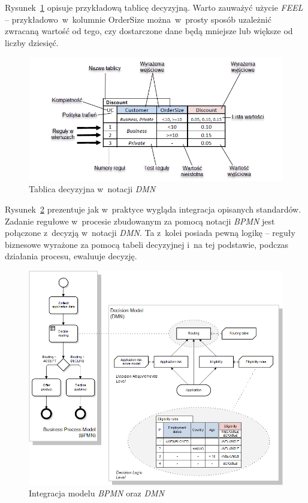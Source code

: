 Rysunek~\ref{fig:dmnTable} opisuje przykładową tablicę decyzyjną. Warto zauważyć użycie \emph{FEEL} -- przykładowo~w~kolumnie OrderSize można~w~prosty sposób uzależnić zwracaną wartość od tego, czy dostarczone dane będą mniejsze lub większe od liczby dziesięć.
\begin{figure}
    \centering
    \includegraphics[width=\textwidth]{./assets/dmnTable.png}
    \caption{Tablica decyzyjna w~notacji \emph{DMN}~\cite{DMNTable}}
    \label{fig:dmnTable}
\end{figure}

Rysunek~\ref{fig:dmnExample} prezentuje jak w~praktyce wygląda integracja opisanych standardów. Zadanie regułowe w~procesie zbudowanym za pomocą notacji \emph{BPMN} jest połączone z~decyzją w~notacji \emph{DMN}. Ta z~kolei posiada pewną logikę -- reguły biznesowe wyrażone za pomocą tabeli decyzyjnej i~na tej podstawie, podczas działania procesu, ewaluuje decyzję. 
\begin{figure}
    \centering
    \includegraphics[width=\textwidth,height=0.4\textheight,keepaspectratio]{./assets/dmnExample.png}
    \caption{Integracja modelu \emph{BPMN} oraz \emph{DMN}~\cite{DMN12}}
    \label{fig:dmnExample}
\end{figure}

